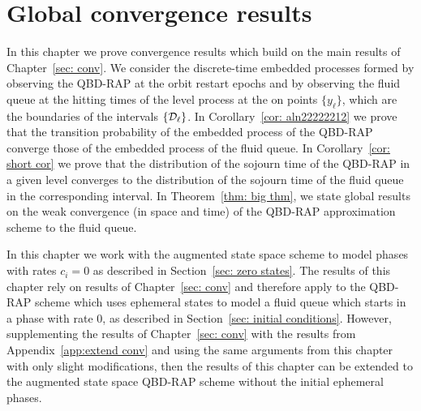 \chapter{Global convergence results}\label{ch: global results}
In this chapter we prove convergence results which build on the main results of Chapter~\ref{sec: conv}. We consider the discrete-time embedded processes formed by observing the QBD-RAP at the orbit restart epochs and by observing the fluid queue at the hitting times of the level process at the on points \(\{y_\ell\}\), which are the boundaries of the intervals \(\{\mathcal{D}_\ell\}\). In Corollary~\ref{cor: aln22222212} we prove that the transition probability of the embedded process of the QBD-RAP converge those of the embedded process of the fluid queue. In Corollary~\ref{cor: short cor} we prove that the distribution of the sojourn time of the QBD-RAP in a given level converges to the distribution of the sojourn time of the fluid queue in the corresponding interval. In Theorem~\ref{thm: big thm}, we state global results on the weak convergence (in space and time) of the QBD-RAP approximation scheme to the fluid queue. 

In this chapter we work with the augmented state space scheme to model phases with rates \(c_i=0\) as described in Section~\ref{sec: zero states}. The results of this chapter rely on results of Chapter~\ref{sec: conv} and therefore apply to the QBD-RAP scheme which uses ephemeral states to model a fluid queue which starts in a phase with rate \(0\), as described in Section~\ref{sec: initial conditions}. However, supplementing the results of Chapter~\ref{sec: conv} with the results from Appendix~\ref{app:extend conv} and using the same arguments from this chapter with only slight modifications, then the results of this chapter can be extended to the augmented state space QBD-RAP scheme without the initial ephemeral phases. 


